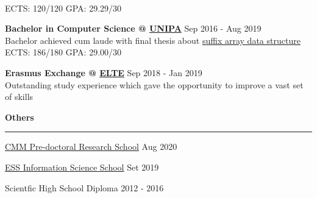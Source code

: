 \documentclass[11pt,letterpaper]{article}
\begin{document}
\begin{justify}
\begin{itemize}[label={}, leftmargin=0pt]
\begin{item}
                  \\
                  ECTS: 120/120 \hspace{0.33cm} GPA: 29.29/30
            \end{item}
            \begin{item}
                  \textbf{Bachelor in Computer Science @ \href{https://www.unipa.it/mobilita/en/}{UNIPA}}
                  \hfill
                  Sep 2016 - Aug 2019
                  \vspace{0.05cm}
                  \\
                  Bachelor achieved cum laude with final thesis about \href{https://dariocurr.github.io/assets/img/poster.png}{suffix array data structure}
                  \\
                  ECTS: 186/180 \hspace{0.33cm} GPA: 29.00/30
            \end{item}
            \begin{item}
                  \textbf{Erasmus Exchange @ \href{https://www.elte.hu/en/}{ELTE}}
                  \hfill
                  Sep 2018 - Jan 2019
                  \vspace{0.05cm}
                  \\
                  Outstanding study experience which gave the opportunity to improve a vast set of skills
            \end{item}
      \end{itemize}
      \setlength{\columnsep}{0.75cm}
      \begin{multicols}{2}
            \textbf{Others}\strut
            \hrule
            \begin{itemize}[label={}, itemsep=-5pt, leftmargin=0pt]
                  \begin{item}
                        \href{https://cmmrs2020.mpi-sws.org/}{CMM Pre-doctoral Research School}
                        \hfill
                        Aug 2020
                  \end{item}
                  \begin{item}
                        \href{http://einfose.ffos.hr/summer-school/}{ESS Information Science School}
                        \hfill
                        Set 2019
                  \end{item}
                  \begin{item}
                        Scientfic High School Diploma
                        \hfill
                        2012 - 2016

\end{item}
\end{itemize}
\end{multicols}
\end{justify}
\end{document}
